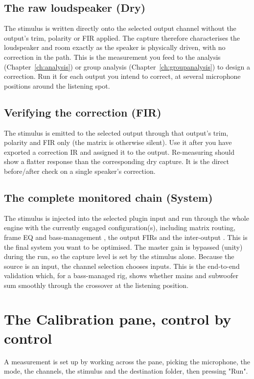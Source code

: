 \subsection{The raw loudspeaker (Dry)}
The stimulus is written directly onto the selected output channel without the output's trim, polarity or FIR applied. The capture therefore characterises the loudspeaker and room exactly as the speaker is physically driven, with no correction in the path. This is the measurement you feed to the analysis (Chapter~\ref{ch:analysis}) or group analysis (Chapter~\ref{ch:groupanalysis}) to design a correction. Run it for each output you intend to correct, at several microphone positions around the listening spot.

\subsection{Verifying the correction (FIR)}
The stimulus is emitted to the selected output through that output's trim, polarity and FIR only (the matrix is otherwise silent). Use it after you have exported a correction IR and assigned it to the output. Re-measuring should show a flatter response than the corresponding dry capture. It is the direct before/after check on a single speaker's correction.

\subsection{The complete monitored chain (System)}
The stimulus is injected into the selected plugin input and run through the whole engine with the currently engaged configuration(s), including matrix routing, frame EQ and bass-management , the output FIRs and the inter-output . This is the final system you want to be optimised. The master gain is bypassed (unity) during the run, so the capture level is set by the stimulus alone. Because the source is an input, the channel selection chooses inputs. This is the end-to-end validation which, for a bass-managed rig, shows whether mains and subwoofer sum smoothly through the crossover at the listening position.

\section{The Calibration pane, control by control}\label{sec:calpane}
A measurement is set up by working across the pane, picking the microphone, the mode, the channels, the stimulus and the destination folder, then pressing "Run".

